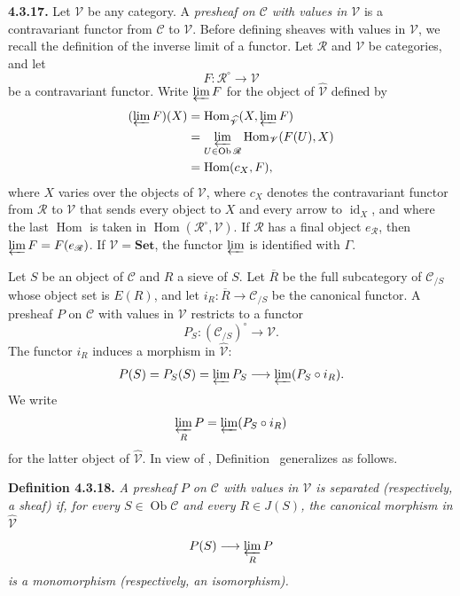 \medskip
\noindent{}\textbf{4.3.17.}
Let \(\mathscr V\) be any category. A \emph{presheaf on \(\mathscr C\)
with values in \(\mathscr V\)} is a contravariant functor from
\(\mathscr C\) to \(\mathscr V\). Before defining sheaves with values in
\(\mathscr V\), we recall the definition of the inverse limit of a
functor. Let \(\mathscr R\) and \(\mathscr V\) be categories, and let
\[
 F:\mathscr R^{\circ}\longrightarrow\mathscr V
\]
be a contravariant functor. Write \(\varprojlim F\) for the object of
\(\widehat{\mathscr V}\) defined by
\[
 \begin{aligned}
 (\varprojlim F)(X)
 &=\operatorname{Hom}_{\widehat{\mathscr V}}
     (X,\varprojlim F)\\
 &=\varprojlim_{U\in\operatorname{Ob}\mathscr R}
     \operatorname{Hom}_{\mathscr V}(F(U),X)\\
 &=\operatorname{Hom}(c_X,F),
 \end{aligned}
\]
where \(X\) varies over the objects of \(\mathscr V\), where \(c_X\)
denotes the contravariant functor from \(\mathscr R\) to \(\mathscr V\)
that sends every object to \(X\) and every arrow to
\(\operatorname{id}_X\), and where the last \(\operatorname{Hom}\) is
taken in \(\operatorname{Hom}(\mathscr R^{\circ},\mathscr V)\). If
\(\mathscr R\) has a final object \(e_{\mathscr R}\), then
\(\varprojlim F=F(e_{\mathscr R})\). If \(\mathscr V=\mathbf{Set}\), the
functor \(\varprojlim\) is identified with \(\Gamma\).

Let \(S\) be an object of \(\mathscr C\) and \(R\) a sieve of \(S\). Let
\(\overline R\) be the full subcategory of \(\mathscr C_{/S}\) whose
object set is \(E(R)\), and let
\(i_R:\overline R\to\mathscr C_{/S}\) be the canonical functor. A
presheaf \(P\) on \(\mathscr C\) with values in \(\mathscr V\) restricts
to a functor
\[
 P_S:(\mathscr C_{/S})^{\circ}\longrightarrow\mathscr V.
\]
The functor \(i_R\) induces a morphism in \(\widehat{\mathscr V}\):
\[
 P(S)=P_S(S)=\varprojlim P_S
 \longrightarrow\varprojlim(P_S\circ i_R).
\]
We write
\[
 \varprojlim_RP=\varprojlim(P_S\circ i_R)
\]
for the latter object of \(\widehat{\mathscr V}\). In view of ,
Definition~ generalizes as follows.

\medskip
\noindent{}\textbf{Definition 4.3.18.}
\textit{A presheaf \(P\) on \(\mathscr C\) with values in \(\mathscr V\)
is \emph{separated} (respectively, a \emph{sheaf}) if, for every
\(S\in\operatorname{Ob}\mathscr C\) and every \(R\in J(S)\), the canonical
morphism in \(\widehat{\mathscr V}\)}
\[
 P(S)\longrightarrow\varprojlim_RP
\]
\textit{is a monomorphism (respectively, an isomorphism).}

